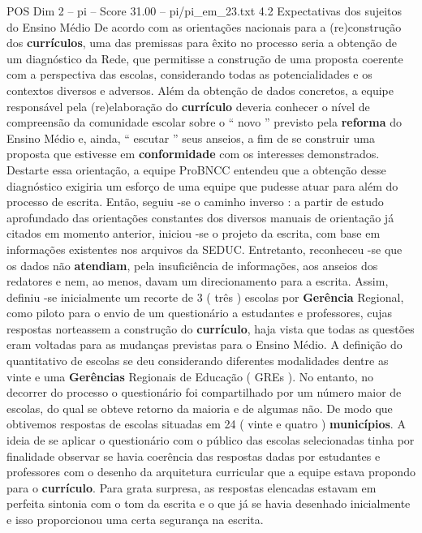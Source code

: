 \begin{textsample}{POS Dim 2 – pi – Score 31.00 – pi/pi\_em\_23.txt}  \label{ex:f2_pos_094}
4.2 Expectativas dos sujeitos do Ensino Médio De acordo com as orientações nacionais para a (re)construção dos \textbf{currículos}, uma das premissas para êxito no processo seria a obtenção de um diagnóstico da Rede, que permitisse a construção de uma proposta coerente com a perspectiva das escolas, considerando todas as potencialidades e os contextos diversos e adversos.
Além da obtenção de dados concretos, a equipe responsável pela (re)elaboração do \textbf{currículo} deveria conhecer o nível de compreensão da comunidade escolar sobre o “ novo ” previsto pela \textbf{reforma} do Ensino Médio e, ainda, “ escutar ” seus anseios, a fim de se construir uma proposta que estivesse em \textbf{conformidade} com os interesses demonstrados.
Destarte essa orientação, a equipe ProBNCC entendeu que a obtenção desse diagnóstico exigiria um esforço de uma equipe que pudesse atuar para além do processo de escrita.
Então, seguiu -se o caminho inverso : a partir de estudo aprofundado das orientações constantes dos diversos manuais de orientação já citados em momento anterior, iniciou -se o projeto da escrita, com base em informações existentes nos arquivos da SEDUC.
Entretanto, reconheceu -se que os dados não \textbf{atendiam}, pela insuficiência de informações, aos anseios dos redatores e nem, ao menos, davam um direcionamento para a escrita.
Assim, definiu -se inicialmente um recorte de 3 ( três ) escolas por \textbf{Gerência} Regional, como piloto para o envio de um questionário a estudantes e professores, cujas respostas norteassem a construção do \textbf{currículo}, haja vista que todas as questões eram voltadas para as mudanças previstas para o Ensino Médio.
A definição do quantitativo de escolas se deu considerando diferentes modalidades dentre as vinte e uma \textbf{Gerências} Regionais de Educação ( GREs ).
No entanto, no decorrer do processo o questionário foi compartilhado por um número maior de escolas, do qual se obteve retorno da maioria e de algumas não.
De modo que obtivemos respostas de escolas situadas em 24 ( vinte e quatro ) \textbf{municípios}.
A ideia de se aplicar o questionário com o público das escolas selecionadas tinha por finalidade observar se havia coerência das respostas dadas por estudantes e professores com o desenho da arquitetura curricular que a equipe estava propondo para o \textbf{currículo}.
Para grata surpresa, as respostas elencadas estavam em perfeita sintonia com o tom da escrita e o que já se havia desenhado inicialmente e isso proporcionou uma certa segurança na escrita.

\end{textsample}
